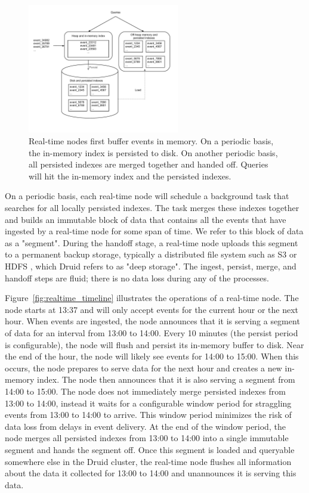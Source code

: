 \documentclass{acm_proc_article-sp}
\begin{document}
\begin{figure} 
\centering 
\includegraphics[width = 2.6in]{realtime_flow}
\caption{Real-time nodes first buffer events in memory. On a periodic basis,
the in-memory index is persisted to disk. On another periodic basis, all
persisted indexes are merged together and handed off. Queries will hit the
in-memory index and the persisted indexes.}
\label{fig:realtime_flow}
\end{figure}

On a periodic basis, each real-time node will schedule a background task that
searches for all locally persisted indexes. The task merges these indexes
together and builds an immutable block of data that contains all the events
that have ingested by a real-time node for some span of time. We refer to this
block of data as a "segment". During the handoff stage, a real-time node
uploads this segment to a permanent backup storage, typically a distributed
file system such as S3 \cite{decandia2007dynamo} or HDFS
\cite{shvachko2010hadoop}, which Druid refers to as "deep storage". The ingest,
persist, merge, and handoff steps are fluid; there is no data loss during any
of the processes.

Figure~\ref{fig:realtime_timeline} illustrates the operations of a real-time
node. The node starts at 13:37 and will only accept events for the current hour
or the next hour. When events are ingested, the node announces that it is
serving a segment of data for an interval from 13:00 to 14:00.  Every 10
minutes (the persist period is configurable), the node will flush and persist
its in-memory buffer to disk.  Near the end of the hour, the node will likely
see events for 14:00 to 15:00. When this occurs, the node prepares to serve
data for the next hour and creates a new in-memory index. The node then
announces that it is also serving a segment from 14:00 to 15:00.  The node does
not immediately merge persisted indexes from 13:00 to 14:00, instead it waits
for a configurable window period for straggling events from 13:00 to 14:00 to
arrive. This window period minimizes the risk of data loss from delays in event
delivery. At the end of the window period, the node merges all persisted
indexes from 13:00 to 14:00 into a single immutable segment and hands the
segment off.  Once this segment is loaded and queryable somewhere else in the
Druid cluster, the real-time node flushes all information about the data it
collected for 13:00 to 14:00 and unannounces it is serving this data. 
\end{document}
